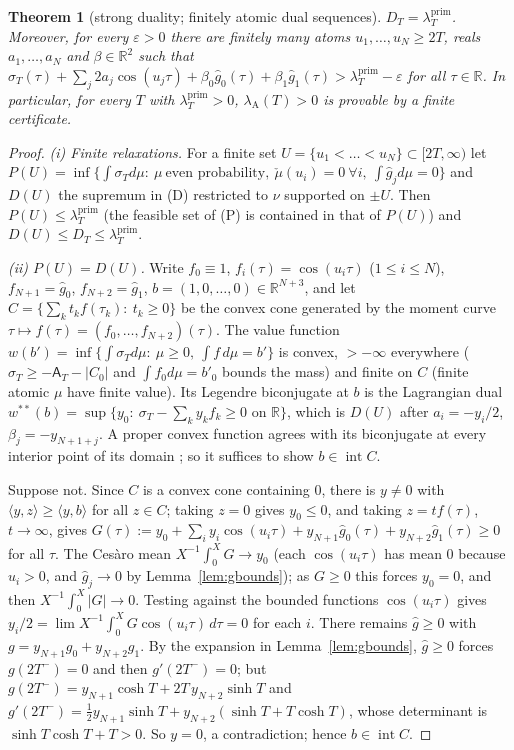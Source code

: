 \documentclass[11pt]{amsart}
\newtheorem{theorem}{Theorem}[section]
\theoremstyle{definition}
\theoremstyle{remark}
\newcommand{\R}{\mathbb R}
\newcommand{\lamP}{\lambda^{\mathrm{prim}}_T}
\newcommand{\lamA}{\lambda_{\mathrm A}(T)}
\newcommand{\sT}{\sigma_T}
\newcommand{\gh}[1]{\widehat g_{#1}}
\newcommand{\Aconst}{\mathsf A_T}
\begin{document}
\begin{theorem}[strong duality; finitely atomic dual sequences]\label{thm:D1}
$D_T=\lamP$. Moreover, for every $\varepsilon>0$ there are finitely many atoms
$u_1,\dots,u_N\ge2T$, reals $a_1,\dots,a_N$ and $\beta\in\R^2$ such that
$\sT(\tau)+\sum_j2a_j\cos(u_j\tau)+\beta_0\gh0(\tau)+\beta_1\gh1(\tau)>\lamP-\varepsilon$ for all $\tau\in\R$.
In particular, for every $T$ with $\lamP>0$, $\lamA>0$ is provable by a finite certificate.
\end{theorem}
\begin{proof}
\emph{(i) Finite relaxations.} For a finite set $U=\{u_1<\dots<u_N\}\subset[2T,\infty)$ let
$P(U)=\inf\{\int\sT d\mu:\ \mu\ \text{even probability},\ \check\mu(u_i)=0\ \forall i,\ \int\gh j d\mu=0\}$
and $D(U)$ the supremum in (D) restricted to $\nu$ supported on $\pm U$. Then $P(U)\le\lamP$
(the feasible set of (P) is contained in that of $P(U)$) and $D(U)\le D_T\le\lamP$.

\emph{(ii) $P(U)=D(U)$.} Write $f_0\equiv1$, $f_i(\tau)=\cos(u_i\tau)$ ($1\le i\le N$),
$f_{N+1}=\gh0$, $f_{N+2}=\gh1$, $b=(1,0,\dots,0)\in\R^{N+3}$, and let
$C=\{\sum_kt_kf(\tau_k):\ t_k\ge0\}$ be the convex cone generated by the moment curve
$\tau\mapsto f(\tau)=(f_0,\dots,f_{N+2})(\tau)$. The value function
$w(b')=\inf\{\int\sT d\mu:\ \mu\ge0,\ \int f\,d\mu=b'\}$ is convex, $>-\infty$ everywhere
($\sT\ge-\Aconst-|C_0|$ and $\int f_0d\mu=b'_0$ bounds the mass) and finite on $C$ (finite atomic
$\mu$ have finite value). Its Legendre biconjugate at $b$ is the Lagrangian dual
$w^{**}(b)=\sup\{y_0:\ \sT-\sum_ky_kf_k\ge0\text{ on }\R\}$, which is $D(U)$ after
$a_i=-y_i/2$, $\beta_j=-y_{N+1+j}$. A proper convex function agrees with its biconjugate at every
interior point of its domain \cite[Thm.~7.4, Cor.~12.1.1]{Rockafellar}; so it suffices to show
$b\in\operatorname{int}C$.

Suppose not. Since $C$ is a convex cone containing $0$, there is $y\ne0$ with
$\langle y,z\rangle\ge\langle y,b\rangle$ for all $z\in C$; taking $z=0$ gives $y_0\le0$, and
taking $z=tf(\tau)$, $t\to\infty$, gives
$G(\tau):=y_0+\sum_iy_i\cos(u_i\tau)+y_{N+1}\gh0(\tau)+y_{N+2}\gh1(\tau)\ge0$ for all $\tau$.
The Ces\`aro mean $X^{-1}\int_0^XG\to y_0$ (each $\cos(u_i\tau)$ has mean $0$ because $u_i>0$,
and $\gh j\to0$ by Lemma~\ref{lem:gbounds}); as $G\ge0$ this forces $y_0=0$, and then
$X^{-1}\int_0^X|G|\to0$. Testing against the bounded functions $\cos(u_i\tau)$ gives
$y_i/2=\lim X^{-1}\int_0^XG\cos(u_i\tau)\,d\tau=0$ for each $i$. There remains
$\widehat g\ge0$ with $g=y_{N+1}g_0+y_{N+2}g_1$. By the expansion in Lemma~\ref{lem:gbounds},
$\widehat g\ge0$ forces $g(2T^-)=0$ and then $g'(2T^-)=0$; but
$g(2T^-)=y_{N+1}\cosh T+2T\,y_{N+2}\sinh T$ and $g'(2T^-)=\frac12y_{N+1}\sinh T+y_{N+2}(\sinh T+T\cosh T)$,
whose determinant is $\sinh T\cosh T+T>0$. So $y=0$, a contradiction; hence $b\in\operatorname{int}C$.


\end{proof}
\end{document}
